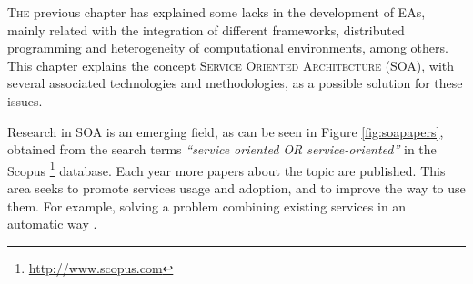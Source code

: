 \label{chap:soa} %
\minitoc\mtcskip
\vfill
\lettrine{T}{he} previous chapter has explained some lacks %
 in the development of EAs, mainly related with the integration of
 different frameworks, distributed programming and heterogeneity of
 computational environments, among others. This chapter explains the
 concept \textsc{Service Oriented Architecture} (SOA), with several
 associated technologies and methodologies, as a possible solution for
 these issues. %

Research in SOA \citep{Papazoglou2007SOA} is an emerging field, %
as can be seen in Figure \ref{fig:soapapers}, obtained from the search
terms {\em ``service oriented OR service-oriented''} in the Scopus
\footnote{\url{http://www.scopus.com}} database. Each year more papers
about the topic are published. This area seeks to promote services
usage and adoption, and to improve the way to use them. For example,
solving a problem combining existing services in an automatic way
\citep{Moussa2010ServiceComposition}. %


